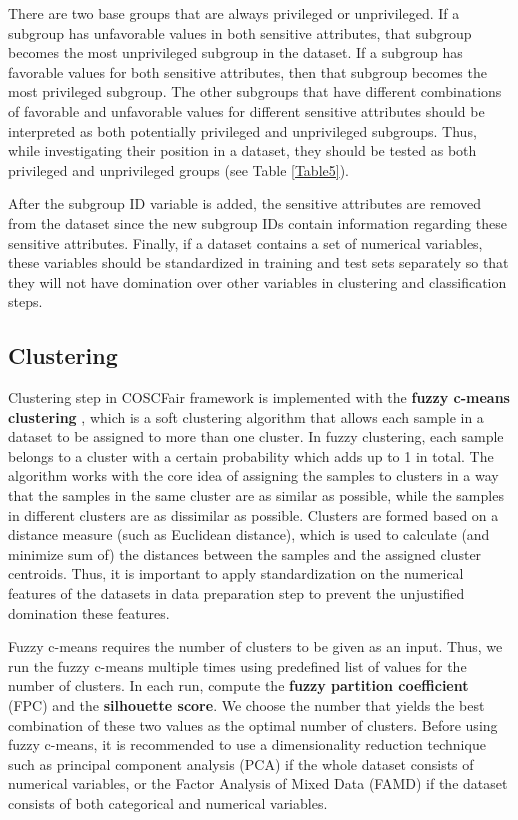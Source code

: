 There are two base groups that are always privileged or unprivileged. If a subgroup has unfavorable values in both sensitive attributes, that subgroup becomes the most unprivileged subgroup in the dataset. If a subgroup has favorable values for both sensitive attributes, then that subgroup becomes the most privileged subgroup. The other subgroups that have different combinations of favorable and unfavorable values for different sensitive attributes should be interpreted as both potentially privileged and unprivileged subgroups. Thus, while investigating their position in a dataset, they should be tested as both privileged and unprivileged groups (see Table \ref{Table5}).

After the subgroup ID variable is added, the sensitive attributes are removed from the dataset since the new subgroup IDs contain information regarding these sensitive attributes. Finally, if a dataset contains a set of numerical variables, these variables should be standardized in training and test sets separately so that they will not have domination over other variables in clustering and classification steps.

\label{alg1}


\subsection{Clustering}\label{ssec:clust}

Clustering step in COSCFair framework is implemented with the \textbf{fuzzy c-means clustering} \cite{fuzzyc}, which is a soft clustering algorithm that allows each sample in a dataset to be assigned to more than one cluster. In fuzzy clustering, each sample belongs to a cluster with a certain probability which adds up to 1 in total. The algorithm works with the core idea of assigning the samples to clusters in a way that the samples in the same cluster are as similar as possible, while the samples in different clusters are as dissimilar as possible. Clusters are formed based on a distance measure (such as Euclidean distance), which is used to calculate (and minimize sum of) the distances between the samples and the assigned cluster centroids. Thus, it is important to apply standardization on the numerical features of the datasets in data preparation step to prevent the unjustified domination these features.

Fuzzy c-means requires the number of clusters to be given as an input. Thus, we run the fuzzy c-means multiple times using predefined list of values for the number of clusters. In each run, compute the \textbf{fuzzy partition coefficient} (FPC) and the \textbf{silhouette score}. We choose the number that yields the best combination of these two values as the optimal number of clusters. Before using fuzzy c-means, it is recommended to use a dimensionality reduction technique such as principal component analysis (PCA) if the whole dataset consists of numerical variables, or the Factor Analysis of Mixed Data (FAMD) if the dataset consists of both categorical and numerical variables.

